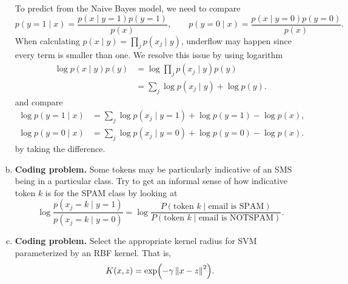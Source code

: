 \documentclass[12pt,letterpaper,boxed]{hmcpset}
\begin{document}
\begin{solution}
\begin{enumerate}[(a)]
    To predict from the Naive Bayes model, we need to compare
    \[
    p(y = 1 \mid x) = \frac{p(x \mid y = 1)p(y = 1)}{p(x)}, \qquad p(y = 0 \mid x) = \frac{p(x \mid y = 0)p(y = 0)}{p(x)}.
    \]
    When calculating $p(x \mid y) = \prod_j p(x_j \mid y)$, underflow may happen since every term is smaller than one. We resolve this issue by using logarithm
    \[
    \begin{aligned}
      \log p(x \mid y)p(y) &= \log \prod_j p(x_j \mid y) p(y) \\
      &= \sum_j \log p(x_j \mid y) + \log p(y).
    \end{aligned}
    \]
    and compare
    \[
    \begin{aligned}
      \log p(y = 1 \mid x) &= \sum_j \log p(x_j \mid y = 1)+ \log p(y=1) - \log p(x), \\
      \log p(y = 0 \mid x) &= \sum_j \log p(x_j \mid y = 0) + \log p(y=0) - \log p(x).
    \end{aligned}
    \]
    by taking the difference.

    \item \textbf{Coding problem.} Some tokens may be particularly indicative of an SMS being in a particular class. Try to get an informal sense of how indicative token $k$ is for the SPAM class by looking at 
    \[
    \log \frac{p(x_j = k \mid y = 1)}{p(x_j = k \mid y = 0)} = \log \frac{P(\text{token } k \mid \text{email is SPAM})}{P(\text{token } k \mid \text{email is NOTSPAM})}.
    \]

    \item \textbf{Coding problem.} Select the appropriate kernel radius for SVM parameterized by an RBF kernel. That is,
    \[
    K(x,z) = \exp(- \gamma \left\lVert x-z\right\rVert^2).
    \]
  \end{enumerate}
\end{solution}
\end{document}
